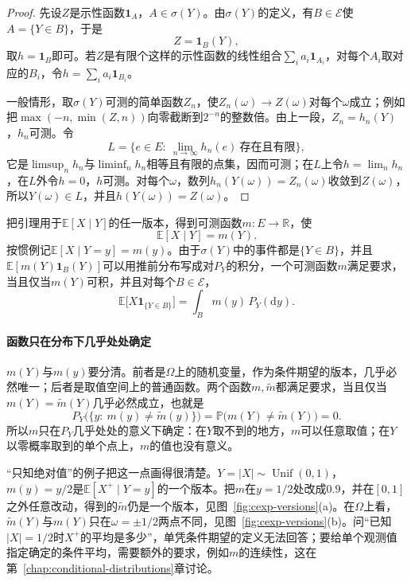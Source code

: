 \begin{proof}
先设$Z$是示性函数$\mathbf{1}_{A}$，$A\in\sigma(Y)$。由$\sigma(Y)$的定义，有$B\in\mathcal{E}$使$A=\{Y\in B\}$，于是
\[
 Z=\mathbf{1}_{B}(Y),
\]
取$h=\mathbf{1}_{B}$即可。若$Z$是有限个这样的示性函数的线性组合$\sum_{i}a_i\mathbf{1}_{A_i}$，对每个$A_i$取对应的$B_i$，令$h=\sum_ia_i\mathbf{1}_{B_i}$。

一般情形，取$\sigma(Y)$可测的简单函数$Z_n$，使$Z_n(\omega)\to Z(\omega)$对每个$\omega$成立；例如把$\max(-n,\min(Z,n))$向零截断到$2^{-n}$的整数倍。由上一段，$Z_n=h_n(Y)$，$h_n$可测。令
\[
 L=\bigl\{e\in E:\ \lim_{n\to\infty}h_n(e)\ \text{存在且有限}\bigr\},
\]
它是$\limsup_nh_n$与$\liminf_nh_n$相等且有限的点集，因而可测；在$L$上令$h=\lim_nh_n$，在$L$外令$h=0$，$h$可测。对每个$\omega$，数列$h_n(Y(\omega))=Z_n(\omega)$收敛到$Z(\omega)$，所以$Y(\omega)\in L$，并且$h(Y(\omega))=Z(\omega)$。
\end{proof}

把引理用于$\mathbb{E}[X\mid Y]$的任一版本，得到可测函数$m:E\to\mathbb{R}$，使
\begin{equation}
 \mathbb{E}[X\mid Y]=m(Y).
 \label{eq:cexp-regression-function}
\end{equation}
按惯例记$\mathbb{E}[X\mid Y=y]=m(y)$。由于$\sigma(Y)$中的事件都是$\{Y\in B\}$，并且$\mathbb{E}[m(Y)\mathbf{1}_B(Y)]$可以用推前分布写成对$P_Y$的积分，一个可测函数$m$满足要求，当且仅当$m(Y)$可积，并且对每个$B\in\mathcal{E}$，
\begin{equation}
 \mathbb{E}\bigl[X\mathbf{1}_{\{Y\in B\}}\bigr]=\int_{B}m(y)\,P_Y(\mathrm{d}y).
 \label{eq:cexp-given-variable-check}
\end{equation}

\paragraph{函数只在分布下几乎处处确定}
$m(Y)$与$m(y)$要分清。前者是$\Omega$上的随机变量，作为条件期望的版本，几乎必然唯一；后者是取值空间上的普通函数。两个函数$m,\tilde m$都满足要求，当且仅当$m(Y)=\tilde m(Y)$几乎必然成立，也就是
\[
 P_Y\bigl(\{y:\ m(y)\neq\tilde m(y)\}\bigr)=\mathbb{P}\bigl(m(Y)\neq\tilde m(Y)\bigr)=0 .
\]
所以$m$只在$P_Y$几乎处处的意义下确定：在$Y$取不到的地方，$m$可以任意取值；在$Y$以零概率取到的单个点上，$m$的值也没有意义。

“只知绝对值”的例子把这一点画得很清楚。$Y=\lvert X\rvert\sim\operatorname{Unif}(0,1)$，$m(y)=y/2$是$\mathbb{E}[X^{+}\mid Y=y]$的一个版本。把$m$在$y=1/2$处改成$0.9$，并在$[0,1]$之外任意改动，得到的$\tilde m$仍是一个版本，见图~\ref{fig:cexp-versions}(a)。在$\Omega$上看，$\tilde m(Y)$与$m(Y)$只在$\omega=\pm1/2$两点不同，见图~\ref{fig:cexp-versions}(b)。问“已知$\lvert X\rvert=1/2$时$X^{+}$的平均是多少”，单凭条件期望的定义无法回答；要给单个观测值指定确定的条件平均，需要额外的要求，例如$m$的连续性，这在第~\ref{chap:conditional-distributions}章讨论。

